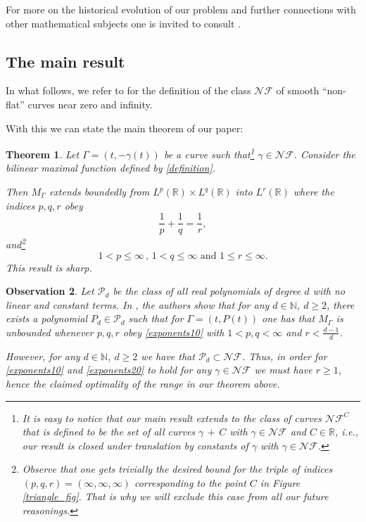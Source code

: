 \documentclass{amsart}
\newcommand{\R}{\mathbb{R}}
\newcommand{\N}{\mathbb{N}}
\newcommand{\g}{\gamma}
\newcommand{\NF}{\mathcal{NF}}
\newtheorem{theorem}{Theorem}[section]
\newtheorem{observation}[theorem]{Observation}
\theoremstyle{definition}
\theoremstyle{remark}
\numberwithin{equation}{section}
\begin{document}
For more on the historical evolution of our problem and further connections with other mathematical subjects one is invited to consult \cite{lie2019unifiedap}.

\subsection{The main result}
 In what follows, we refer to \cite[Section 2]{lie2015boundedness} for the definition of the class $\NF$ of smooth ``non-flat'' curves near zero and infinity.

With this we can state the main theorem of our paper:

\begin{theorem}\label{main_theorem}
 Let $\Gamma=(t,-\gamma(t))$ be a curve such that\footnote{It is easy to notice that our main result extends to the class of curves $\NF^{C}$ that is defined to be the set of all curves $\g\,+\,C$ with $\g\in\NF$ and $C\in\R$, \textit{i.e.}, our result is closed under translation by constants of $\g$ with $\g\in\NF$.} $\gamma\in\NF$. Consider the bilinear maximal function defined by \eqref{definition}.

 Then $M_\Gamma$ extends boundedly from $L^p(\R)\times L^{q}(\R)$ into $L^r(\R)$ where the indices $p, q, r$ obey
	\begin{equation}\label{exponents10}
	\frac{1}{p}+\frac{1}{q}=\frac{1}{r},
	\end{equation}
	and\footnote{Observe that one gets trivially the desired bound for the triple of indices $(p,q,r)=(\infty,\infty,\infty)$ corresponding to the point $C$ in Figure \ref{triangle_fig}. That is why we will exclude this case from all our future reasonings.}
	\begin{equation}\label{exponents20}
	1<p\leq\infty\,,\, 1<q\leq\infty \mbox{ and } 1\leq r\leq \infty.
	\end{equation}
This result is sharp.
\end{theorem}



\begin{observation}
Let $\mathcal{P}_d$ be the class of all real polynomials of degree $d$ with no linear and constant terms. In \cite[Section 3]{liXiao2016uniform}, the authors show that for any $d\in\N$, $d\ge2$, there exists a polynomial
$P_d\in\mathcal{P}_d$ such that for $\Gamma=(t,P(t))$ one has that $M_\Gamma$ is unbounded whenever $p, q, r$ obey \eqref{exponents10} with $1<p, q<\infty$ and $r<\frac{d-1}{d}$.

However, for any $d\in\N$, $d\ge2$ we have that $\mathcal{P}_d\subset\NF$. Thus, in order for \eqref{exponents10} and \eqref{exponents20} to hold for any $\gamma\in\NF$ we must have $r\ge 1$, hence the claimed optimality of the range in our theorem above.
\end{observation}
\end{document}
